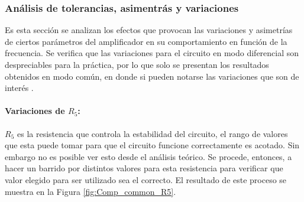 \subsubsection{An\'alisis de tolerancias, asimentr\'as y variaciones}
Es esta secci\'on se analizan los efectos que provocan las variaciones y asimetr\'ias  de ciertos par\'ametros del amplificador en su comportamiento en funci\'on de la frecuencia. Se verifica que las variaciones para el circuito en modo diferencial son despreciables para la pr\'actica, por lo que solo se presentan los resultados obtenidos en modo com\'un, en donde si pueden notarse las variaciones que son de inter\'es . 

\paragraph{Variaciones de $R_5$:}
$R_5$ es la resistencia que controla la estabilidad del circuito, el rango de valores que esta puede tomar para que el circuito funcione correctamente es acotado. Sin embargo no es posible ver esto desde el an\'alisis te\'orico. Se procede, entonces, a hacer un barrido por distintos valores para esta resistencia para verificar que valor elegido para ser utilizado sea el correcto. 
El resultado de este proceso se muestra en la Figura \ref{fig:Comp_common_R5}.
